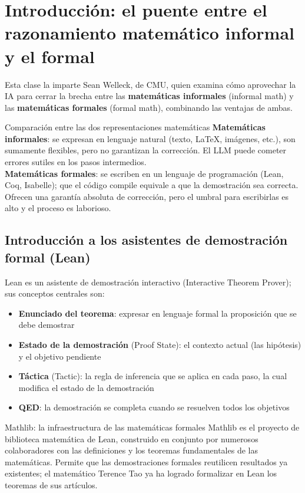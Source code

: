\section{Introducción: el puente entre el razonamiento matemático informal y el formal}

Esta clase la imparte Sean Welleck, de CMU, quien examina cómo aprovechar la IA para cerrar la brecha entre las \textbf{matemáticas informales} (informal math) y las \textbf{matemáticas formales} (formal math), combinando las ventajas de ambas.

\begin{importantbox}{Comparación entre las dos representaciones matemáticas}
\textbf{Matemáticas informales}: se expresan en lenguaje natural (texto, LaTeX, imágenes, etc.), son sumamente flexibles, pero no garantizan la corrección. El LLM puede cometer errores sutiles en los pasos intermedios.\\
\textbf{Matemáticas formales}: se escriben en un lenguaje de programación (Lean, Coq, Isabelle); que el código compile equivale a que la demostración sea correcta. Ofrecen una garantía absoluta de corrección, pero el umbral para escribirlas es alto y el proceso es laborioso.
\end{importantbox}

\subsection{Introducción a los asistentes de demostración formal (Lean)}

Lean es un asistente de demostración interactivo (Interactive Theorem Prover); sus conceptos centrales son:
\begin{itemize}
    \item \textbf{Enunciado del teorema}: expresar en lenguaje formal la proposición que se debe demostrar
    \item \textbf{Estado de la demostración} (Proof State): el contexto actual (las hipótesis) y el objetivo pendiente
    \item \textbf{Táctica} (Tactic): la regla de inferencia que se aplica en cada paso, la cual modifica el estado de la demostración
    \item \textbf{QED}: la demostración se completa cuando se resuelven todos los objetivos
\end{itemize}

\begin{knowledgebox}{Mathlib: la infraestructura de las matemáticas formales}
Mathlib es el proyecto de biblioteca matemática de Lean, construido en conjunto por numerosos colaboradores con las definiciones y los teoremas fundamentales de las matemáticas. Permite que las demostraciones formales reutilicen resultados ya existentes; el matemático Terence Tao ya ha logrado formalizar en Lean los teoremas de sus artículos.
\end{knowledgebox}

